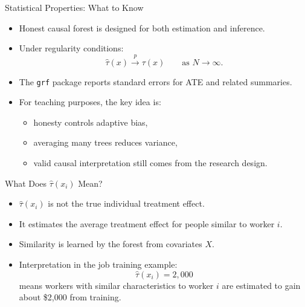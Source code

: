 \documentclass[hyperref={pdfpagelabels=false}]{beamer}
\begin{document}
\begin{frame}{Statistical Properties: What to Know}
\begin{itemize}
  \item Honest causal forest is designed for both estimation and inference.
  \vspace{0.2cm}
  \item Under regularity conditions:
  \[
    \hat{\tau}(x)\xrightarrow{p}\tau(x)
    \qquad \text{as } N\to\infty.
  \]
  \vspace{0.2cm}
  \item The \texttt{grf} package reports standard errors for ATE and related summaries.
  \vspace{0.2cm}
  \item For teaching purposes, the key idea is:
  \vspace{0.1cm}
  \begin{itemize}
    \item honesty controls adaptive bias,
    \item averaging many trees reduces variance,
    \item valid causal interpretation still comes from the research design.
  \end{itemize}
\end{itemize}
\end{frame}

\begin{frame}{What Does $\hat{\tau}(x_i)$ Mean?}
\begin{itemize}
  \item $\hat{\tau}(x_i)$ is not the true individual treatment effect.
  \vspace{0.2cm}
  \item It estimates the average treatment effect for people similar to worker $i$.
  \vspace{0.2cm}
  \item Similarity is learned by the forest from covariates $X$.
  \vspace{0.2cm}
  \item Interpretation in the job training example:
  \[
    \hat{\tau}(x_i)=2{,}000
  \]
  means workers with similar characteristics to worker $i$ are estimated to gain about \$2,000 from training.
\end{itemize}
\end{frame}
\end{document}
